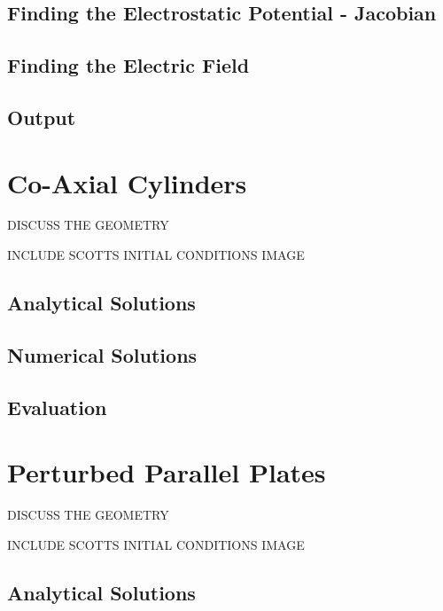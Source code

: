 \documentclass{article}
\begin{document}
\subsection{Finding the Electrostatic Potential - Jacobian}



\subsection{Finding the Electric Field}



\subsection{Output}



\section{Co-Axial Cylinders}

DISCUSS THE GEOMETRY

INCLUDE SCOTTS INITIAL CONDITIONS IMAGE



\subsection{Analytical Solutions}


\subsection{Numerical Solutions}



\subsection{Evaluation}




\section{Perturbed Parallel Plates}

DISCUSS THE GEOMETRY

INCLUDE SCOTTS INITIAL CONDITIONS IMAGE



\subsection{Analytical Solutions}
\end{document}
